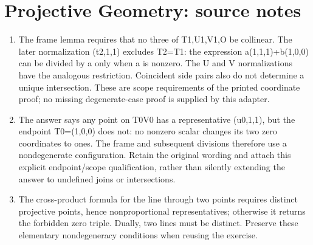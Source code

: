 \section*{Projective Geometry: source notes}
\begin{enumerate}
\item The frame lemma requires that no three of T1,U1,V1,O be collinear. The later normalization (t2,1,1) excludes T2=T1: the expression a(1,1,1)+b(1,0,0) can be divided by a only when a is nonzero. The U and V normalizations have the analogous restriction. Coincident side pairs also do not determine a unique intersection. These are scope requirements of the printed coordinate proof; no missing degenerate-case proof is supplied by this adapter.
\item The answer says any point on T0V0 has a representative (u0,1,1), but the endpoint T0=(1,0,0) does not: no nonzero scalar changes its two zero coordinates to ones. The frame and subsequent divisions therefore use a nondegenerate configuration. Retain the original wording and attach this explicit endpoint/scope qualification, rather than silently extending the answer to undefined joins or intersections.
\item The cross-product formula for the line through two points requires distinct projective points, hence nonproportional representatives; otherwise it returns the forbidden zero triple. Dually, two lines must be distinct. Preserve these elementary nondegeneracy conditions when reusing the exercise.
\end{enumerate}

